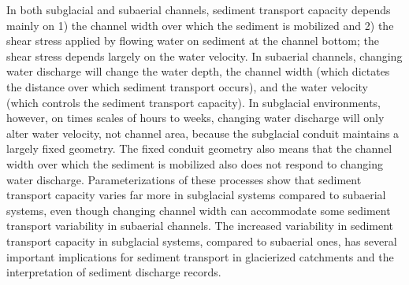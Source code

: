 \documentclass[11pt]{article}
\begin{document}
\laysummary %
In both subglacial and subaerial channels, sediment transport capacity depends mainly on 1) the channel width over which the sediment is mobilized  and 2) the shear stress applied by flowing water on sediment at the channel bottom; the shear stress depends largely on the water velocity.
In subaerial channels, changing water discharge will  change the water depth,  the channel width (which dictates the distance  over which sediment transport  occurs), and the  water velocity (which controls the sediment transport capacity).
 In subglacial environments, however, on times scales of hours to weeks, changing water discharge will only alter  water velocity, not channel area, because the subglacial conduit maintains a largely fixed geometry.
The fixed conduit geometry also means that the channel width over which the sediment is  mobilized also does not respond to changing water discharge.
Parameterizations of these processes show that sediment transport capacity varies far more in subglacial systems compared to subaerial systems, even though changing channel width can accommodate some sediment transport variability in subaerial channels.
The increased variability in sediment transport capacity in subglacial systems, compared to subaerial ones, has several important implications for sediment transport in glacierized catchments and the interpretation of sediment discharge records.
\end{document}
